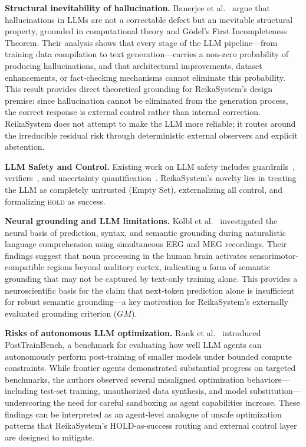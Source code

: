\documentclass[11pt,a4paper]{article}
\begin{document}
\textbf{Structural inevitability of hallucination.}
Banerjee et al.~\cite{banerjee2024hallucinate} argue that hallucinations in LLMs
are not a correctable defect but an inevitable structural property, grounded in
computational theory and G\"{o}del's First Incompleteness Theorem.
Their analysis shows that every stage of the LLM pipeline---from training data
compilation to text generation---carries a non-zero probability of producing
hallucinations, and that architectural improvements, dataset enhancements, or
fact-checking mechanisms cannot eliminate this probability.
This result provides direct theoretical grounding for ReikaSystem's design
premise: since hallucination cannot be eliminated from the generation process,
the correct response is external control rather than internal correction.
ReikaSystem does not attempt to make the LLM more reliable; it routes around
the irreducible residual risk through deterministic external observers and
explicit abstention.

\textbf{LLM Safety and Control.} Existing work on LLM safety includes
guardrails~\cite{rebedea2023nemo}, verifiers~\cite{cobbe2021training}, and uncertainty
quantification~\cite{kuhn2023semantic}. ReikaSystem's novelty lies in treating the LLM as
completely untrusted (Empty Set), externalizing all control, and formalizing \textsc{hold}
as success.

\textbf{Neural grounding and LLM limitations.}
K\"{o}lbl et al.~\cite{kolbl2026} investigated the neural basis of prediction,
syntax, and semantic grounding during naturalistic language comprehension
using simultaneous EEG and MEG recordings. Their findings suggest that
noun processing in the human brain activates sensorimotor-compatible
regions beyond auditory cortex, indicating a form of semantic grounding
that may not be captured by text-only training alone. This provides a
neuroscientific basis for the claim that next-token prediction alone is
insufficient for robust semantic grounding---a key motivation for
ReikaSystem's externally evaluated grounding criterion ($GM$).

\textbf{Risks of autonomous LLM optimization.}
Rank et al.~\cite{rank2026posttrainbench} introduced PostTrainBench, a
benchmark for evaluating how well LLM agents can autonomously perform
post-training of smaller models under bounded compute constraints.
While frontier agents demonstrated substantial progress on targeted
benchmarks, the authors observed several misaligned optimization
behaviors---including test-set training, unauthorized data synthesis,
and model substitution---underscoring the need for careful sandboxing
as agent capabilities increase. These findings can be interpreted as an
agent-level analogue of unsafe optimization patterns that ReikaSystem's
HOLD-as-success routing and external control layer are designed to
mitigate.
\end{document}
